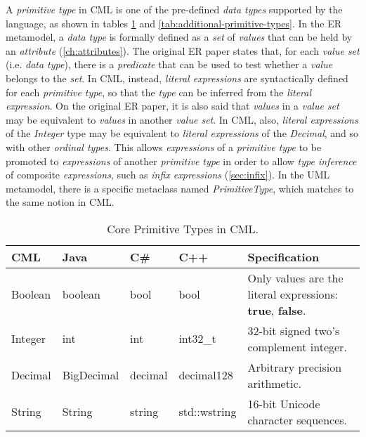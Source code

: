 \begin{definition}
A \emph{primitive type} in CML is one of the pre-defined \emph{data types}
supported by the language,
as shown in tables \ref{tab:core-primitive-types} and \ref{tab:additional-primitive-types}.
In the ER \cite{er} metamodel,
a \emph{data type} is formally defined as a \emph{set} of \emph{values}
that can be held by an \emph{attribute} (\ref{ch:attributes}).
The original ER paper \cite{er} states that,
for each \emph{value set} (i.e. \emph{data type}),
there is a \emph{predicate} that can be used to test
whether a \emph{value} belongs to the \emph{set}.
In CML, instead,
\emph{literal expressions} are syntactically defined for each \emph{primitive type},
so that the \emph{type} can be inferred from the \emph{literal expression}.
On the original ER paper,
it is also said that \emph{values} in a \emph{value set}
may be equivalent to \emph{values} in another \emph{value set}.
In CML, also,
\emph{literal expressions} of the \emph{Integer} type may be equivalent 
to \emph{literal expressions} of the \emph{Decimal},
and so with other \emph{ordinal types}.
This allows \emph{expressions} of a \emph{primitive type}
to be promoted to \emph{expressions} of another \emph{primitive type}
in order to allow \emph{type inference} of composite \emph{expressions},
such as \emph{infix expressions} (\ref{sec:infix}).
In the UML \cite{uml} metamodel,
there is a specific metaclass named \emph{PrimitiveType},
which matches to the same notion in CML.
\end{definition}

\begin{table}[h]
\centering
\begin{tabular}
{l l l l p{7cm} }
\hline
CML & Java & C\# & C++ & Specification \\
\hline
Boolean & boolean & bool & bool & Only values are the literal expressions: \textbf{true}, \textbf{false}. \\
Integer & int & int & int32\_t & 32-bit signed two's complement integer. \\
Decimal & BigDecimal & decimal & decimal128 & Arbitrary precision arithmetic. \\
String & String & string & std::wstring & 16-bit Unicode character sequences. \\
\end{tabular}
\caption{Core Primitive Types in CML.}
\label{tab:core-primitive-types}
\end{table}


